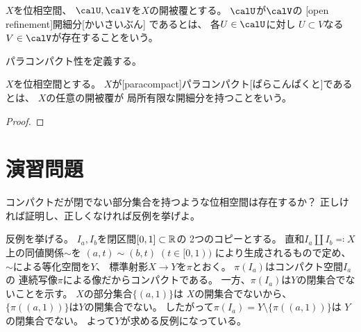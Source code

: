 \documentclass[report]{jlreq}
\begin{document}
\begin{definition}[開細分]
    $X$を位相空間、
    $\calU, \calV$を$X$の開被覆とする。
    $\calU$が$\calV$の
    [open refinement]{開細分}[かいさいぶん]
    であるとは、
    各$U \in \calU$に対し
    $U \subset V$なる$V \in \calV$が存在することをいう。
\end{definition}

パラコンパクト性を定義する。

\begin{definition}[パラコンパクト]
    $X$を位相空間とする。
    $X$が[paracompact]{パラコンパクト}[ぱらこんぱくと]であるとは、
    $X$の任意の開被覆が
    局所有限な開細分を持つことをいう。
\end{definition}

\begin{proposition}[パラコンパクト性の特徴付け]
    \TODO{}
\end{proposition}

\begin{proof}
    \TODO{}
\end{proof}

%
\section{演習問題}

\begin{problem}
    コンパクトだが閉でない部分集合を持つような位相空間は存在するか？
    正しければ証明し、正しくなければ反例を挙げよ。
\end{problem}

\begin{answer}
    反例を挙げる。
    $I_a, I_b$を閉区間$[0, 1] \subset \mathbb{R}$の
    2つのコピーとする。
    直和$I_a \amalg I_b \eqqcolon X$上の同値関係$\sim$を
    $(a, t) \sim (b, t) \; (t \in [0, 1))$
    により生成されるもので定め、
    $\sim$による等化空間を$Y$、
    標準射影$X \to Y$を$\pi$とおく。
    $\pi(I_a)$はコンパクト空間$I_a$の
    連続写像$\pi$による像だからコンパクトである。
    一方、$\pi(I_a)$は$Y$の閉集合でないことを示す。
    $X$の部分集合$\{ (a, 1) \}$は
    $X$の開集合でないから、
    $\{ \pi((a, 1)) \}$は$Y$の開集合でない。
    したがって$\pi(I_a) = Y \setminus \{ \pi((a, 1)) \}$は
    $Y$の閉集合でない。
    よって$Y$が求める反例になっている。
\end{answer}
\end{document}
